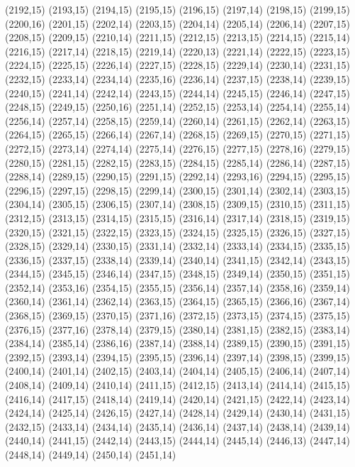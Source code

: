 (2192,15)
(2193,15)
(2194,15)
(2195,15)
(2196,15)
(2197,14)
(2198,15)
(2199,15)
(2200,16)
(2201,15)
(2202,14)
(2203,15)
(2204,14)
(2205,14)
(2206,14)
(2207,15)
(2208,15)
(2209,15)
(2210,14)
(2211,15)
(2212,15)
(2213,15)
(2214,15)
(2215,14)
(2216,15)
(2217,14)
(2218,15)
(2219,14)
(2220,13)
(2221,14)
(2222,15)
(2223,15)
(2224,15)
(2225,15)
(2226,14)
(2227,15)
(2228,15)
(2229,14)
(2230,14)
(2231,15)
(2232,15)
(2233,14)
(2234,14)
(2235,16)
(2236,14)
(2237,15)
(2238,14)
(2239,15)
(2240,15)
(2241,14)
(2242,14)
(2243,15)
(2244,14)
(2245,15)
(2246,14)
(2247,15)
(2248,15)
(2249,15)
(2250,16)
(2251,14)
(2252,15)
(2253,14)
(2254,14)
(2255,14)
(2256,14)
(2257,14)
(2258,15)
(2259,14)
(2260,14)
(2261,15)
(2262,14)
(2263,15)
(2264,15)
(2265,15)
(2266,14)
(2267,14)
(2268,15)
(2269,15)
(2270,15)
(2271,15)
(2272,15)
(2273,14)
(2274,14)
(2275,14)
(2276,15)
(2277,15)
(2278,16)
(2279,15)
(2280,15)
(2281,15)
(2282,15)
(2283,15)
(2284,15)
(2285,14)
(2286,14)
(2287,15)
(2288,14)
(2289,15)
(2290,15)
(2291,15)
(2292,14)
(2293,16)
(2294,15)
(2295,15)
(2296,15)
(2297,15)
(2298,15)
(2299,14)
(2300,15)
(2301,14)
(2302,14)
(2303,15)
(2304,14)
(2305,15)
(2306,15)
(2307,14)
(2308,15)
(2309,15)
(2310,15)
(2311,15)
(2312,15)
(2313,15)
(2314,15)
(2315,15)
(2316,14)
(2317,14)
(2318,15)
(2319,15)
(2320,15)
(2321,15)
(2322,15)
(2323,15)
(2324,15)
(2325,15)
(2326,15)
(2327,15)
(2328,15)
(2329,14)
(2330,15)
(2331,14)
(2332,14)
(2333,14)
(2334,15)
(2335,15)
(2336,15)
(2337,15)
(2338,14)
(2339,14)
(2340,14)
(2341,15)
(2342,14)
(2343,15)
(2344,15)
(2345,15)
(2346,14)
(2347,15)
(2348,15)
(2349,14)
(2350,15)
(2351,15)
(2352,14)
(2353,16)
(2354,15)
(2355,15)
(2356,14)
(2357,14)
(2358,16)
(2359,14)
(2360,14)
(2361,14)
(2362,14)
(2363,15)
(2364,15)
(2365,15)
(2366,16)
(2367,14)
(2368,15)
(2369,15)
(2370,15)
(2371,16)
(2372,15)
(2373,15)
(2374,15)
(2375,15)
(2376,15)
(2377,16)
(2378,14)
(2379,15)
(2380,14)
(2381,15)
(2382,15)
(2383,14)
(2384,14)
(2385,14)
(2386,16)
(2387,14)
(2388,14)
(2389,15)
(2390,15)
(2391,15)
(2392,15)
(2393,14)
(2394,15)
(2395,15)
(2396,14)
(2397,14)
(2398,15)
(2399,15)
(2400,14)
(2401,14)
(2402,15)
(2403,14)
(2404,14)
(2405,15)
(2406,14)
(2407,14)
(2408,14)
(2409,14)
(2410,14)
(2411,15)
(2412,15)
(2413,14)
(2414,14)
(2415,15)
(2416,14)
(2417,15)
(2418,14)
(2419,14)
(2420,14)
(2421,15)
(2422,14)
(2423,14)
(2424,14)
(2425,14)
(2426,15)
(2427,14)
(2428,14)
(2429,14)
(2430,14)
(2431,15)
(2432,15)
(2433,14)
(2434,14)
(2435,14)
(2436,14)
(2437,14)
(2438,14)
(2439,14)
(2440,14)
(2441,15)
(2442,14)
(2443,15)
(2444,14)
(2445,14)
(2446,13)
(2447,14)
(2448,14)
(2449,14)
(2450,14)
(2451,14)
